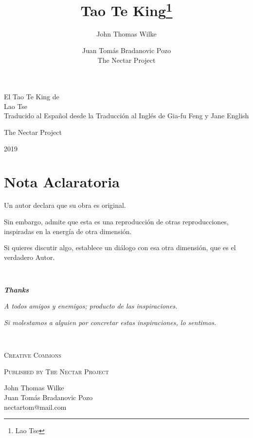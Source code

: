 \documentclass[book,b5paper,hidelinks,final]{memoir}
\newlength{\tpheight}\setlength{\tpheight}{0.9\textheight}
\newlength{\txtheight}\setlength{\txtheight}{0.9\tpheight}
\newlength{\drop}
\begin{document}
	\title{Tao Te King\thanks{Lao Tse}}
	\author{
		John Thomas Wilke	\and
		Juan Tomás Bradanovic Pozo\\
		The Nectar Project}

\begin{titlingpage}

\begingroup
	\centering
	\vfill
	{\Huge El Tao Te King de}\\[\baselineskip]
	{\Huge Lao Tse}\\[\baselineskip]
	{\large Traducido al Español desde la Traducción al Inglés de Gia-fu Feng y Jane English}\\[0.5\drop]
	
	\vfill
	
	{\Large The Nectar Project}\par
	{\large\scshape 2019}\par
	\vfill\null
\endgroup

\end{titlingpage}
	
\frontmatter


	
	\chapter*{Nota Aclaratoria}
	
	Un autor declara que su obra es original.
	
	Sin embargo, admite que esta es una reproducción de otras
	reproducciones, inspiradas en la energía de otra dimensión.
	
	Si quieres discutir algo, establece un diálogo con esa otra dimensión,
	que es el verdadero Autor.
	

	\cleardoublepage
	~\vfill

		
		\textit{\textbf{Thanks}}

		\textit{A todos amigos y enemigos; producto de las inspiraciones.}
		
		\textit{Si molestamos a alguien por concretar estas inspiraciones, lo sentimos.}
	
	\newpage
		~\vfill
		\thispagestyle{empty}
		\setlength{\parindent}{0pt}
		\setlength{\parskip}{\baselineskip}
		
			\ccLogo \space \textsc{Creative Commons}
		
		\par\textsc{Published by The Nectar Project}
		
		\par John Thomas Wilke	\\
		Juan Tomás Bradanovic Pozo	\\
		nectartom@mail.com
		
\end{document}
